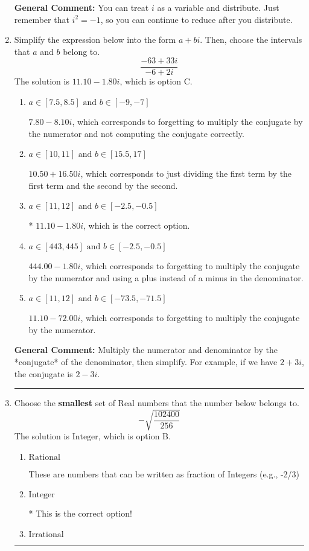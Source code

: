 \documentclass{extbook}[14pt]
\newcommand{\litem}[1]{\item #1

\rule{\textwidth}{0.4pt}}
\begin{document}
\begin{enumerate}
{\textbf{General Comment:} You can treat $i$ as a variable and distribute. Just remember that $i^2=-1$, so you can continue to reduce after you distribute.
}
\litem{
Simplify the expression below into the form $a+bi$. Then, choose the intervals that $a$ and $b$ belong to.
\[ \frac{-63 + 33 i}{-6 + 2 i} \]The solution is \( 11.10  - 1.80 i \), which is option C.\begin{enumerate}[label=\Alph*.]
\item \( a \in [7.5, 8.5] \text{ and } b \in [-9, -7] \)

 $7.80  - 8.10 i$, which corresponds to forgetting to multiply the conjugate by the numerator and not computing the conjugate correctly.
\item \( a \in [10, 11] \text{ and } b \in [15.5, 17] \)

 $10.50  + 16.50 i$, which corresponds to just dividing the first term by the first term and the second by the second.
\item \( a \in [11, 12] \text{ and } b \in [-2.5, -0.5] \)

* $11.10  - 1.80 i$, which is the correct option.
\item \( a \in [443, 445] \text{ and } b \in [-2.5, -0.5] \)

 $444.00  - 1.80 i$, which corresponds to forgetting to multiply the conjugate by the numerator and using a plus instead of a minus in the denominator.
\item \( a \in [11, 12] \text{ and } b \in [-73.5, -71.5] \)

 $11.10  - 72.00 i$, which corresponds to forgetting to multiply the conjugate by the numerator.
\end{enumerate}

\textbf{General Comment:} Multiply the numerator and denominator by the *conjugate* of the denominator, then simplify. For example, if we have $2+3i$, the conjugate is $2-3i$.
}
\litem{
Choose the \textbf{smallest} set of Real numbers that the number below belongs to.
\[ -\sqrt{\frac{102400}{256}} \]The solution is \( \text{Integer} \), which is option B.\begin{enumerate}[label=\Alph*.]
\item \( \text{Rational} \)

These are numbers that can be written as fraction of Integers (e.g., -2/3)
\item \( \text{Integer} \)

* This is the correct option!
\item \( \text{Irrational} \)


\end{enumerate}}
\end{enumerate}
\end{document}
